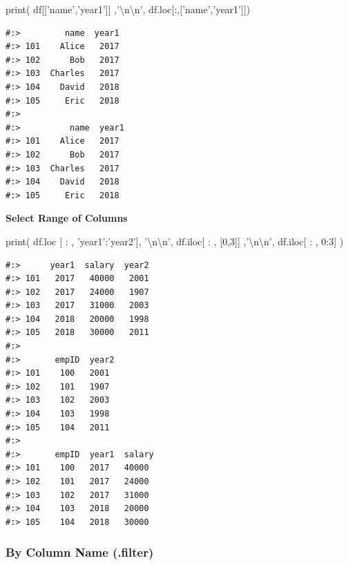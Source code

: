 \documentclass[
]{book}
\newenvironment{Shaded}{\begin{snugshade}}{\end{snugshade}}
\newcommand{\BuiltInTok}[1]{#1}
\newcommand{\CharTok}[1]{\textcolor[rgb]{0.5,0.5,0.5}{#1}}
\newcommand{\DecValTok}[1]{\textcolor[rgb]{0.06,0.06,0.06}{#1}}
\newcommand{\NormalTok}[1]{#1}
\newcommand{\StringTok}[1]{\textcolor[rgb]{0.5,0.5,0.5}{#1}}
\begin{document}
\begin{Shaded}
\begin{Highlighting}[]
\BuiltInTok{print}\NormalTok{(}
\NormalTok{  df[[}\StringTok{'name'}\NormalTok{,}\StringTok{'year1'}\NormalTok{]]       ,}\StringTok{'}\CharTok{\textbackslash{}n\textbackslash{}n}\StringTok{'}\NormalTok{,}
\NormalTok{  df.loc[:,[}\StringTok{'name'}\NormalTok{,}\StringTok{'year1'}\NormalTok{]])}
\end{Highlighting}
\end{Shaded}

\begin{verbatim}
#:>         name  year1
#:> 101    Alice   2017
#:> 102      Bob   2017
#:> 103  Charles   2017
#:> 104    David   2018
#:> 105     Eric   2018 
#:> 
#:>          name  year1
#:> 101    Alice   2017
#:> 102      Bob   2017
#:> 103  Charles   2017
#:> 104    David   2018
#:> 105     Eric   2018
\end{verbatim}

\textbf{Select Range of Columns}

\begin{Shaded}
\begin{Highlighting}[]
\BuiltInTok{print}\NormalTok{(}
\NormalTok{  df.loc [ : , }\StringTok{'year1'}\NormalTok{:}\StringTok{'year2'}\NormalTok{], }\StringTok{'}\CharTok{\textbackslash{}n\textbackslash{}n}\StringTok{'}\NormalTok{,}
\NormalTok{  df.iloc[ : , [}\DecValTok{0}\NormalTok{,}\DecValTok{3}\NormalTok{]]           ,}\StringTok{'}\CharTok{\textbackslash{}n\textbackslash{}n}\StringTok{'}\NormalTok{,}
\NormalTok{  df.iloc[ : , }\DecValTok{0}\NormalTok{:}\DecValTok{3}\NormalTok{]}
\NormalTok{)}
\end{Highlighting}
\end{Shaded}

\begin{verbatim}
#:>      year1  salary  year2
#:> 101   2017   40000   2001
#:> 102   2017   24000   1907
#:> 103   2017   31000   2003
#:> 104   2018   20000   1998
#:> 105   2018   30000   2011 
#:> 
#:>       empID  year2
#:> 101    100   2001
#:> 102    101   1907
#:> 103    102   2003
#:> 104    103   1998
#:> 105    104   2011 
#:> 
#:>       empID  year1  salary
#:> 101    100   2017   40000
#:> 102    101   2017   24000
#:> 103    102   2017   31000
#:> 104    103   2018   20000
#:> 105    104   2018   30000
\end{verbatim}

\hypertarget{by-column-name-.filter}{%
\subsubsection{By Column Name (.filter)}\label{by-column-name-.filter}}
\end{document}
